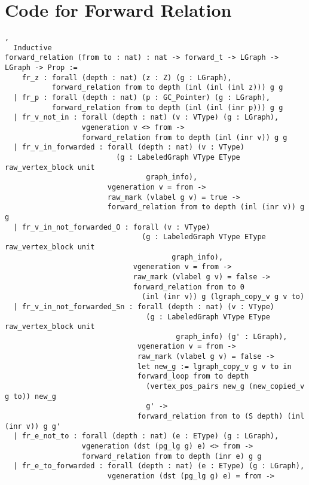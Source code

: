\documentclass[acmsmall,review,anonymous]{acmart}\settopmatter{printfolios=true,printccs=false,printacmref=false}
\begin{document}
\section{Code for Forward Relation}
\label{apx:forwardrelation}
  \begin{lstlisting}[basicstyle=\normalfont\tiny\tt],
  Inductive
forward_relation (from to : nat) : nat -> forward_t -> LGraph -> LGraph -> Prop :=
    fr_z : forall (depth : nat) (z : Z) (g : LGraph),
           forward_relation from to depth (inl (inl (inl z))) g g
  | fr_p : forall (depth : nat) (p : GC_Pointer) (g : LGraph),
           forward_relation from to depth (inl (inl (inr p))) g g
  | fr_v_not_in : forall (depth : nat) (v : VType) (g : LGraph),
                  vgeneration v <> from ->
                  forward_relation from to depth (inl (inr v)) g g
  | fr_v_in_forwarded : forall (depth : nat) (v : VType)
                          (g : LabeledGraph VType EType raw_vertex_block unit
                                 graph_info),
                        vgeneration v = from ->
                        raw_mark (vlabel g v) = true ->
                        forward_relation from to depth (inl (inr v)) g g
  | fr_v_in_not_forwarded_O : forall (v : VType)
                                (g : LabeledGraph VType EType raw_vertex_block unit
                                       graph_info),
                              vgeneration v = from ->
                              raw_mark (vlabel g v) = false ->
                              forward_relation from to 0 
                                (inl (inr v)) g (lgraph_copy_v g v to)
  | fr_v_in_not_forwarded_Sn : forall (depth : nat) (v : VType)
                                 (g : LabeledGraph VType EType raw_vertex_block unit
                                        graph_info) (g' : LGraph),
                               vgeneration v = from ->
                               raw_mark (vlabel g v) = false ->
                               let new_g := lgraph_copy_v g v to in
                               forward_loop from to depth
                                 (vertex_pos_pairs new_g (new_copied_v g to)) new_g
                                 g' ->
                               forward_relation from to (S depth) (inl (inr v)) g g'
  | fr_e_not_to : forall (depth : nat) (e : EType) (g : LGraph),
                  vgeneration (dst (pg_lg g) e) <> from ->
                  forward_relation from to depth (inr e) g g
  | fr_e_to_forwarded : forall (depth : nat) (e : EType) (g : LGraph),
                        vgeneration (dst (pg_lg g) e) = from ->

\end{lstlisting}
\end{document}
